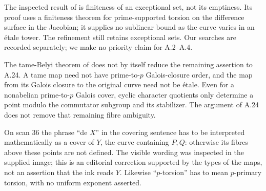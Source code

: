 The inspected result of \citet[Proposition 1.8(vi) and Corollary
1.11(iii)]{A_SaidiTamagawa2009} is finiteness of an exceptional set,
not its emptiness. Its proof uses a finiteness theorem for
prime-supported torsion on the difference surface in the Jacobian;
it supplies no sublinear bound as the curve varies in an \'etale
tower. The refinement \citep{A_SaidiTamagawa2017} still retains
exceptional sets. Our searches are recorded separately; we make
no priority claim for A.2--A.4.

The tame-Belyi theorem of \citet[Theorems 1.2 and
1.5]{A_KedlayaLittWitaszek2023} does not by itself reduce
the remaining assertion to A.24. A tame map need not have
prime-to-$p$ Galois-closure order, and the map from its
Galois closure to the original curve need not be \'etale.
Even for a nonabelian prime-to-$p$ Galois cover, cyclic
character quotients only determine a point modulo the
commutator subgroup and its stabilizer. The argument of
A.24 does not remove that remaining fibre ambiguity.

On scan 36 the phrase ``de $X$'' in the covering sentence has to be
interpreted mathematically as a cover of $Y$, the curve containing
$P,Q$: otherwise its fibres above these points are not defined.
The visible wording was inspected in the supplied image; this is
an editorial correction supported by the types of the maps, not
an assertion that the ink reads $Y$. Likewise ``$p$-torsion'' has
to mean $p$-primary torsion, with no uniform exponent asserted.
